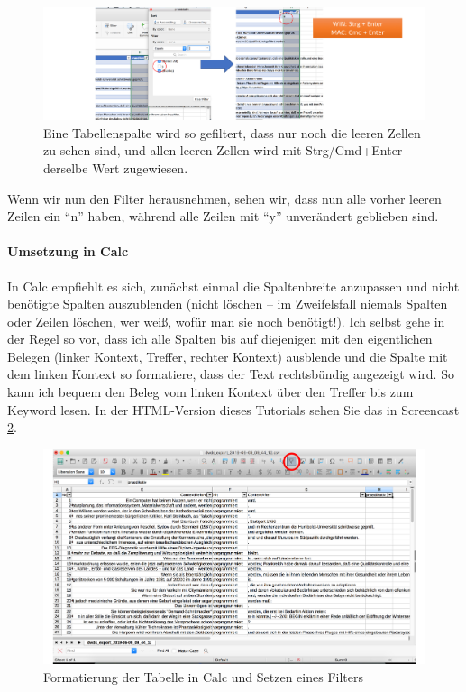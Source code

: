 \documentclass[]{article}
\let\oldparagraph\paragraph
\renewcommand{\paragraph}[1]{\oldparagraph{#1}\mbox{}}
\begin{document}
\begin{figure}
\includegraphics[width=6.66in]{docs/fig/excel_bulk_change} \caption{Eine Tabellenspalte wird so gefiltert, dass nur noch die leeren Zellen zu sehen sind, und allen leeren Zellen wird mit Strg/Cmd+Enter derselbe Wert zugewiesen.}\label{fig:excelbulkchange}
\end{figure}

Wenn wir nun den Filter herausnehmen, sehen wir, dass nun alle vorher
leeren Zeilen ein \enquote{n} haben, während alle Zeilen mit \enquote{y}
unverändert geblieben sind.

\hypertarget{umsetzung-in-calc}{\paragraph{Umsetzung in
Calc}\label{umsetzung-in-calc}}

In Calc empfiehlt es sich, zunächst einmal die Spaltenbreite anzupassen
und nicht benötigte Spalten auszublenden (nicht löschen -- im
Zweifelsfall niemals Spalten oder Zeilen löschen, wer weiß, wofür man
sie noch benötigt!). Ich selbst gehe in der Regel so vor, dass ich alle
Spalten bis auf diejenigen mit den eigentlichen Belegen (linker Kontext,
Treffer, rechter Kontext) ausblende und die Spalte mit dem linken
Kontext so formatiere, dass der Text rechtsbündig angezeigt wird. So
kann ich bequem den Beleg vom linken Kontext über den Treffer bis zum
Keyword lesen. In der HTML-Version dieses Tutorials sehen Sie das in
Screencast \ref{fig:calcformat}.

\begin{figure}
\includegraphics[width=6.66in]{docs/fig/calcformat} \caption{Formatierung der Tabelle in Calc und Setzen eines Filters}\label{fig:calcformat}
\end{figure}
\end{document}
